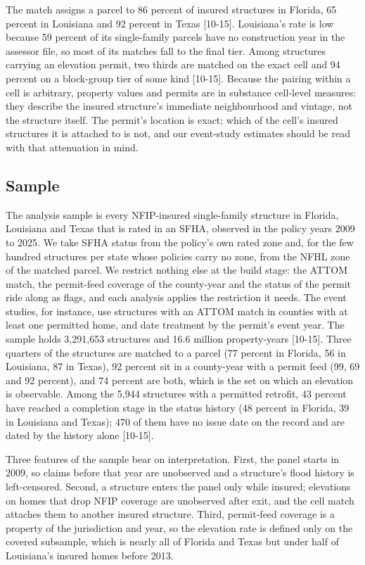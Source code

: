 The match assigns a parcel to 86 percent of insured structures in Florida, 65 percent in
Louisiana and 92 percent in Texas [10-15]. Louisiana's rate is low because 59 percent of its
single-family parcels have no construction year in the assessor file, so most of its matches
fall to the final tier. Among structures carrying an elevation permit, two thirds are matched
on the exact cell and 94 percent on a block-group tier of some kind [10-15]. Because the
pairing within a cell is arbitrary, property values and permits are in substance cell-level
measures: they describe the insured structure's immediate neighbourhood and vintage, not the
structure itself. The permit's location is exact; which of the cell's insured structures it is
attached to is not, and our event-study estimates should be read with that attenuation in mind.

\subsection{Sample}

The analysis sample is every NFIP-insured single-family structure in Florida, Louisiana and
Texas that is rated in an SFHA, observed in the policy years 2009 to 2025. We take SFHA status
from the policy's own rated zone and, for the few hundred structures per state whose policies
carry no zone, from the NFHL zone of the matched parcel. We restrict nothing else at the build
stage: the ATTOM match, the permit-feed coverage of the county-year and the status of the
permit ride along as flags, and each analysis applies the restriction it needs. The event
studies, for instance, use structures with an ATTOM match in counties with at least one
permitted home, and date treatment by the permit's event year. The sample holds 3,291,653
structures and 16.6 million property-years [10-15]. Three quarters of the structures are
matched to a parcel (77 percent in Florida, 56 in Louisiana, 87 in Texas), 92 percent sit in a
county-year with a permit feed (99, 69 and 92 percent), and 74 percent are both, which is the
set on which an elevation is observable. Among the 5,944 structures with a permitted retrofit,
43 percent have reached a completion stage in the status history (48 percent in Florida, 39 in
Louisiana and Texas); 470 of them have no issue date on the record and are dated by the history
alone [10-15].

Three features of the sample bear on interpretation. First, the panel starts in 2009, so claims
before that year are unobserved and a structure's flood history is left-censored. Second, a
structure enters the panel only while insured; elevations on homes that drop NFIP coverage are
unobserved after exit, and the cell match attaches them to another insured structure. Third,
permit-feed coverage is a property of the jurisdiction and year, so the elevation rate is
defined only on the covered subsample, which is nearly all of Florida and Texas but under
half of Louisiana's insured homes before 2013.

